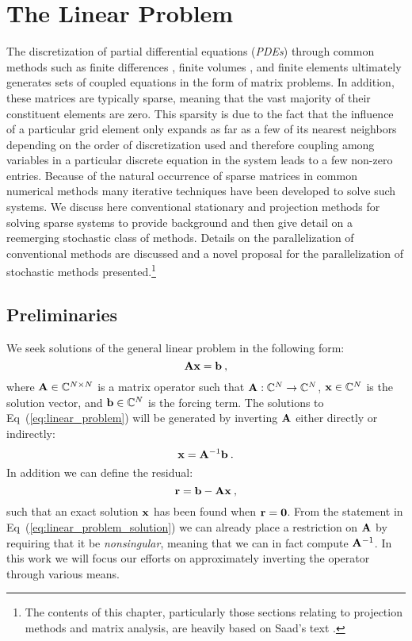 \chapter{The Linear Problem}
\label{ch:linear_problem}
The discretization of partial differential equations (\textit{PDEs})
through common methods such as finite differences
\citep{leveque_2007}, finite volumes \citep{leveque_2002}, and finite
elements \citep{zienkiewicz_1977} ultimately generates sets of coupled
equations in the form of matrix problems.  In addition, these matrices
are typically sparse, meaning that the vast majority of their
constituent elements are zero. This sparsity is due to the fact that
the influence of a particular grid element only expands as far as a
few of its nearest neighbors depending on the order of discretization
used and therefore coupling among variables in a particular discrete
equation in the system leads to a few non-zero entries. Because of the
natural occurrence of sparse matrices in common numerical methods many
iterative techniques have been developed to solve such systems. We
discuss here conventional stationary and projection methods for
solving sparse systems to provide background and then give detail on a
reemerging stochastic class of methods. Details on the parallelization
of conventional methods are discussed and a novel proposal for the
parallelization of stochastic methods presented.\footnote{The contents
  of this chapter, particularly those sections relating to projection
  methods and matrix analysis, are heavily based on Saad's text
  \citep{saad_2003}.}

\section{Preliminaries}
\label{sec:linear_preliminaries}
We seek solutions of the general linear problem in the following form:
\begin{equation}
  \mathbf{A} \mathbf{x} = \mathbf{b}\:,
  \label{eq:linear_problem}
\end{equation}
where $\mathbf{A} \in \mathbb{C}^{N \times N}$ is a matrix operator such
that $\mathbf{A} : \mathbb{C}^{N} \rightarrow \mathbb{C}^{N}$, $\mathbf{x} \in
\mathbb{C}^N$ is the solution vector, and $\mathbf{b} \in \mathbb{C}^N$ is
the forcing term. The solutions to Eq~(\ref{eq:linear_problem}) will
be generated by inverting $\mathbf{A}$ either directly or indirectly:
\begin{equation}
  \mathbf{x} = \mathbf{A}^{-1} \mathbf{b}
  \label{eq:linear_problem_solution}\:.
\end{equation}
In addition we can define the residual:
\begin{equation}
  \mathbf{r} = \mathbf{b} - \mathbf{A}\mathbf{x}\:,
  \label{eq:linear_residual}
\end{equation}
such that an exact solution $\mathbf{x}$ has been found when
$\mathbf{r}=\mathbf{0}$.  From the statement in
Eq~(\ref{eq:linear_problem_solution}) we can already place a
restriction on $\mathbf{A}$ by requiring that it be \textit{nonsingular},
meaning that we can in fact compute $\mathbf{A}^{-1}$. In this work we
will focus our efforts on approximately inverting the operator through
various means.

